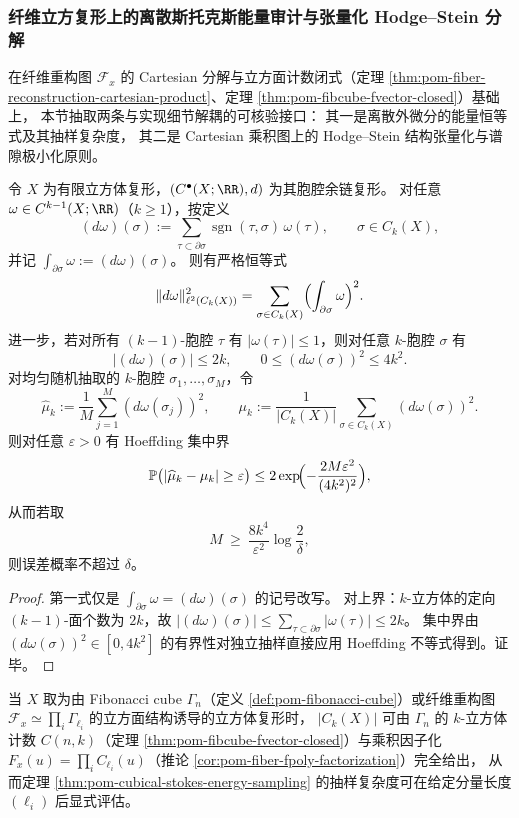 \subsubsection{纤维立方复形上的离散斯托克斯能量审计与张量化 Hodge--Stein 分解}\label{subsubsec:pom-fiber-stokes-energy-hodge-stein}
在纤维重构图 \(\mathcal F_x\) 的 Cartesian 分解与立方面计数闭式（定理 \ref{thm:pom-fiber-reconstruction-cartesian-product}、定理 \ref{thm:pom-fibcube-fvector-closed}）基础上，
本节抽取两条与实现细节解耦的可核验接口：
其一是离散外微分的能量恒等式及其抽样复杂度，
其二是 Cartesian 乘积图上的 Hodge--Stein 结构张量化与谱隙极小化原则。

\begin{theorem}[离散外微分能量的边界审计恒等式与抽样复杂度]\label{thm:pom-cubical-stokes-energy-sampling}
令 \(X\) 为有限立方体复形，\((C^\bullet(X;\RR),d)\) 为其胞腔余链复形。
对任意 \(\omega\in C^{k-1}(X;\RR)\)（\(k\ge 1\)），按定义
\[
(d\omega)(\sigma)
:=\sum_{\tau\subset\partial\sigma}\operatorname{sgn}(\tau,\sigma)\,\omega(\tau),
\qquad \sigma\in C_k(X),
\]
并记
\(
\int_{\partial\sigma}\omega:=(d\omega)(\sigma)
\)。
则有严格恒等式
\[
\|d\omega\|_{\ell^2(C_k(X))}^2
=\sum_{\sigma\in C_k(X)}\Bigl(\int_{\partial\sigma}\omega\Bigr)^2.
\]
进一步，若对所有 \((k{-}1)\)-胞腔 \(\tau\) 有 \(|\omega(\tau)|\le 1\)，则对任意 \(k\)-胞腔 \(\sigma\) 有
\[
|(d\omega)(\sigma)|\le 2k,
\qquad
0\le (d\omega(\sigma))^2\le 4k^2.
\]
对均匀随机抽取的 \(k\)-胞腔 \(\sigma_1,\dots,\sigma_M\)，令
\[
\widehat\mu_k:=\frac1M\sum_{j=1}^M(d\omega(\sigma_j))^2,\qquad
\mu_k:=\frac{1}{|C_k(X)|}\sum_{\sigma\in C_k(X)}(d\omega(\sigma))^2.
\]
则对任意 \(\varepsilon>0\) 有 Hoeffding 集中界
\[
\mathbb P\bigl(|\widehat\mu_k-\mu_k|\ge\varepsilon\bigr)
\le
2\exp\!\Bigl(-\frac{2M\varepsilon^2}{(4k^2)^2}\Bigr),
\]
从而若取
\[
M\ \ge\ \frac{8k^4}{\varepsilon^2}\log\frac{2}{\delta},
\]
则误差概率不超过 \(\delta\)。
\end{theorem}

\begin{proof}
第一式仅是 \(\int_{\partial\sigma}\omega=(d\omega)(\sigma)\) 的记号改写。
对上界：\(k\)-立方体的定向 \((k{-}1)\)-面个数为 \(2k\)，故
\(
|(d\omega)(\sigma)|\le \sum_{\tau\subset\partial\sigma}|\omega(\tau)|\le 2k
\)。
集中界由 \((d\omega(\sigma))^2\in[0,4k^2]\) 的有界性对独立抽样直接应用 Hoeffding 不等式得到。证毕。
\end{proof}

\begin{remark}\label{rem:pom-fiber-stokes-energy-sampling-count-interface}
当 \(X\) 取为由 Fibonacci cube \(\Gamma_n\)（定义 \ref{def:pom-fibonacci-cube}）或纤维重构图 \(\mathcal F_x\simeq \prod_i\Gamma_{\ell_i}\) 的立方面结构诱导的立方体复形时，
\(|C_k(X)|\) 可由 \(\Gamma_n\) 的 \(k\)-立方体计数 \(C(n,k)\)（定理 \ref{thm:pom-fibcube-fvector-closed}）与乘积因子化 \(F_x(u)=\prod_i C_{\ell_i}(u)\)（推论 \ref{cor:pom-fiber-fpoly-factorization}）完全给出，
从而定理 \ref{thm:pom-cubical-stokes-energy-sampling} 的抽样复杂度可在给定分量长度 \((\ell_i)\) 后显式评估。
\end{remark}


